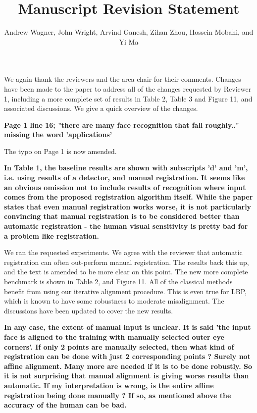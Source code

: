 \documentclass[11pt]{article}
\begin{document}
   

   \title{\Large {\bf Manuscript  Revision Statement}}

   \author{{Andrew Wagner, John Wright, Arvind Ganesh, Zihan Zhou, Hossein Mobahi, and Yi Ma}}

   \date{}
   \maketitle

We again thank the reviewers and the area chair for their comments.
Changes have been made to the paper to address all of the changes requested by Reviewer 1,
including a more complete set of results in Table 2, Table 3 and Figure 11, and associated
discussions.  We give a quick overview of the changes.

{\bf
	Page 1 line 16; "there are many face recognition that fall roughly.."
	missing the word 'applications'
}

The typo on Page 1 is now amended.

{\bf
	In Table 1, the baseline results are shown with subscripts 'd' and 'm', i.e.
	using results of a detector, and manual registration. It seems like an obvious
	omission not to include results of recognition where input comes from the
	proposed registration algorithm itself. While the paper states that even
	manual registration works worse, it is not particularly convincing that manual
	registration is to be considered better than automatic registration - the
	human visual sensitivity is pretty bad for a problem like registration.
}

We ran the requested experiments.  We agree with the reviewer that automatic registration
can often out-perform manual registration.  The results back this up, and the text
is amended to be more clear on this point.  The new more complete benchmark is shown in
Table 2, and Figure 11.  All of the classical methods benefit from using our iterative
alignment procedure.  This is even true for LBP, which is known to have some robustness
to moderate misalignment.  The discussions have been updated to cover the new results.

{\bf
	In any case, the extent of manual input is unclear. It is said 'the input face
	is aligned to the training with manually selected outer eye corners'. If only
	2 points are manually selected, then what kind of registration can be done
	with just 2 corresponding points ? Surely not affine alignment. Many more are
	needed if it is to be done robustly. So it is not surprising that manual
	alignment is giving worse results than automatic. If my interpretation is
	wrong, is the entire affine registration being done manually ? If so, as
	mentioned above the accuracy of the human can be bad.
}
\end{document}

